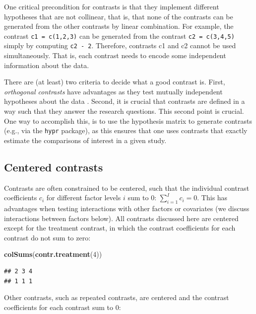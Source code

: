 \documentclass[12pt,]{krantz}
\newenvironment{Shaded}{\begin{snugshade}}{\end{snugshade}}
\newcommand{\KeywordTok}[1]{\textcolor[rgb]{0.13,0.29,0.53}{\textbf{#1}}}
\newcommand{\DecValTok}[1]{\textcolor[rgb]{0.00,0.00,0.81}{#1}}
\newcommand{\NormalTok}[1]{#1}
\theoremstyle{definition}
\theoremstyle{definition}
\theoremstyle{definition}
\theoremstyle{remark}
\begin{document}
One critical precondition for contrasts is that they implement different
hypotheses that are not collinear, that is, that none of the contrasts
can be generated from the other contrasts by linear combination. For
example, the contrast \texttt{c1\ =\ c(1,2,3)} can be generated from the
contrast \texttt{c2\ =\ c(3,4,5)} simply by computing \texttt{c2\ -\ 2}.
Therefore, contrasts c1 and c2 cannot be used simultaneously. That is,
each contrast needs to encode some independent information about the
data.

There are (at least) two criteria to decide what a good contrast is.
First, \textit{orthogonal contrasts} have advantages as they test
mutually independent hypotheses about the data \citep[see][section
6.2.5, p.~91 for a detailed explanation of
orthogonality]{dobson2011introduction}. Second, it is crucial that
contrasts are defined in a way such that they answer the research
questions. This second point is crucial. One way to accomplish this, is
to use the hypothesis matrix to generate contrasts (e.g., via the
\texttt{hypr} package), as this ensures that one uses contrasts that
exactly estimate the comparisons of interest in a given study.

\subsection{Centered contrasts}\label{centered-contrasts}

Contrasts are often constrained to be centered, such that the individual
contrast coefficients \(c_i\) for different factor levels \(i\) sum to
\(0\): \(\sum_{i=1}^I c_i = 0\). This has advantages when testing
interactions with other factors or covariates (we discuss interactions
between factors below). All contrasts discussed here are centered except
for the treatment contrast, in which the contrast coefficients for each
contrast do not sum to zero:

\begin{Shaded}
\begin{Highlighting}[]
\KeywordTok{colSums}\NormalTok{(}\KeywordTok{contr.treatment}\NormalTok{(}\DecValTok{4}\NormalTok{))}
\end{Highlighting}
\end{Shaded}

\begin{verbatim}
## 2 3 4 
## 1 1 1
\end{verbatim}

Other contrasts, such as repeated contrasts, are centered and the
contrast coefficients for each contrast sum to \(0\):
\end{document}
